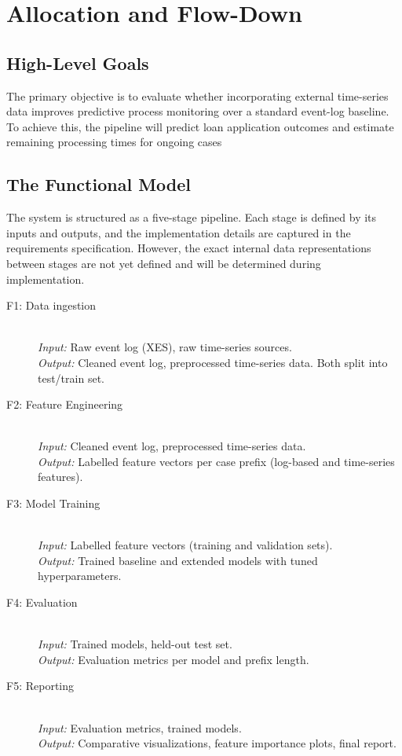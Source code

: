 \documentclass[runningheads]{llncs}
\begin{document}
\section{Allocation and Flow-Down}


\subsection{High-Level Goals}

The primary objective is to evaluate whether incorporating external time-series data improves predictive process monitoring over a standard event-log baseline. To achieve this, the pipeline will predict loan application outcomes and estimate remaining processing times for ongoing cases

\subsection{The Functional Model}
The system is structured as a five-stage pipeline. Each stage is defined by its inputs and outputs, and the implementation details are captured in the requirements specification. However, the exact internal data representations between stages are not yet defined and will be determined during implementation.

\begin{description}
    \item[F1: Data ingestion] \hfill \\
          \textit{Input:} Raw event log (XES), raw time-series sources. \\
          \textit{Output:} Cleaned event log, preprocessed time-series data. Both split into test/train set.

    \item[F2: Feature Engineering] \hfill \\
          \textit{Input:} Cleaned event log, preprocessed time-series data. \\
          \textit{Output:} Labelled feature vectors per case prefix (log-based and time-series features).

    \item[F3: Model Training] \hfill \\
          \textit{Input:} Labelled feature vectors (training and validation sets). \\
          \textit{Output:} Trained baseline and extended models with tuned hyperparameters.

    \item[F4: Evaluation] \hfill \\
          \textit{Input:} Trained models, held-out test set. \\
          \textit{Output:} Evaluation metrics per model and prefix length.

    \item[F5: Reporting] \hfill \\
          \textit{Input:} Evaluation metrics, trained models. \\
          \textit{Output:} Comparative visualizations, feature importance plots, final report.
\end{description}
\end{document}
